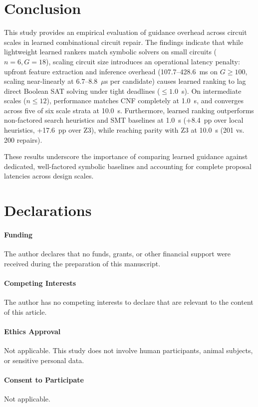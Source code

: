 \documentclass[11pt,a4paper]{article}
\begin{document}
\section{Conclusion}
This study provides an empirical evaluation of guidance overhead across circuit scales in learned combinational circuit repair. The findings indicate that while lightweight learned rankers match symbolic solvers on small circuits ($n=6, G=18$), scaling circuit size introduces an operational latency penalty: upfront feature extraction and inference overhead (107.7--428.6~ms on $G \ge 100$, scaling near-linearly at 6.7--8.8~$\mu$s per candidate) causes learned ranking to lag direct Boolean SAT solving under tight deadlines ($\le 1.0$~s). On intermediate scales ($n \le 12$), performance matches CNF completely at 1.0~s, and converges across five of six scale strata at 10.0~s. Furthermore, learned ranking outperforms non-factored search heuristics and SMT baselines at 1.0~s (+8.4~pp over local heuristics, +17.6~pp over Z3), while reaching parity with Z3 at 10.0~s (201 vs. 200 repairs).

These results underscore the importance of comparing learned guidance against dedicated, well-factored symbolic baselines and accounting for complete proposal latencies across design scales.


\section*{Declarations}

\paragraph{Funding}
The author declares that no funds, grants, or other financial support were received during the preparation of this manuscript.

\paragraph{Competing Interests}
The author has no competing interests to declare that are relevant to the content of this article.

\paragraph{Ethics Approval}
Not applicable. This study does not involve human participants, animal subjects, or sensitive personal data.

\paragraph{Consent to Participate}
Not applicable.
\end{document}
